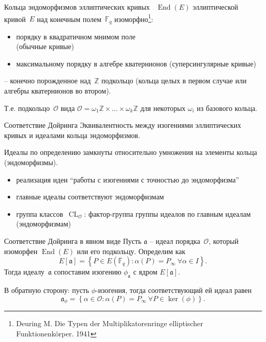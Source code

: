 \documentclass{beamer}
\begin{document}
\begin{frame}{Кольца эндоморфизмов эллиптических кривых}
	~$\operatorname{End}(E)$ эллиптической кривой~$E$ над конечным полем~$\mathbb{F}_q$ изоморфно\footnote{\scriptsize Deuring M. Die Typen der Multiplikatorenringe elliptischer Funktionenkörper. 1941}:
	\begin{itemize}
		\item порядку в квадратичном мнимом поле\\(\textcolor{struct-color}{обычные кривые})
		\item максимальному порядку в алгебре кватернионов (\textcolor{struct-color}{суперсингулярные кривые})
	\end{itemize}
	
	\vspace{0.5em}
	 -- конечно порожденное над~$\mathbb{Z}$ подкольцо (кольца целых в первом случае или алгебры кватернионов во втором).
	
	\vspace{0.5em}
	Т.е. подкольцо~$\mathcal{O}$ вида $\mathcal{O} = \omega_1 \mathbb{Z} \times \ldots \times \omega_k \mathbb{Z}$ для некоторых $\omega_i$ из базового кольца.
\end{frame}

\begin{frame}{Соответствие Дойринга}
	Эквивалентность между изогениями эллиптических кривых и идеалами кольца эндоморфизмов.
	
	\vspace{1em}
	
	Идеалы по определению замкнуты относительно умножения на элементы кольца (эндоморфизмы).
	\vspace{1em}
	
	\begin{itemize}
		\item реализация идеи ``работы с изогениями с точностью до эндоморфизма''
		\item главные идеалы соответствуют эндоморфизмам
		\item группа классов~$\operatorname{CL}_\mathcal{O}$: фактор-группа группы идеалов по главным идеалам (эндоморфизмам) 
	\end{itemize}
\end{frame}

\begin{frame}{Соответствие Дойринга в явном виде}
	Пусть $\mathfrak{a}$ -- идеал порядка~$\mathcal{O}$, который изоморфен $\operatorname{End}(E)$ или его подкольцу. Определим  как
	\[
	E[\mathfrak{a}] = \left\{P \in E(\overline{\mathbb{F}}_q): \alpha(P) = P_\infty~\forall \alpha \in I \right\}.
	\]
	Тогда идеалу~$\mathfrak{a}$ сопоставим изогению  $\phi_\mathfrak{a}$ с ядром $E[\mathfrak{a}]$.
	\vspace{0.5em}
	
	В обратную сторону: пусть $\phi$-изогения, тогда соответствующий ей идеал равен
	\[
	\mathfrak{a}_\phi = \left\{ \alpha \in \mathcal{O}: \alpha(P) = P_\infty ~\forall P \in \ker(\phi) \right\}.
	\]
\end{frame}
\end{document}
